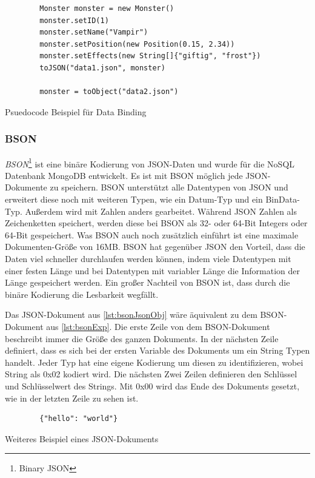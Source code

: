 \begin{listing}[htp]
    \begin{verbatim} 
        Monster monster = new Monster()
        monster.setID(1)
        monster.setName("Vampir")
        monster.setPosition(new Position(0.15, 2.34))
        monster.setEffects(new String[]{"giftig", "frost"})
        toJSON("data1.json", monster)

        monster = toObject("data2.json")
    \end{verbatim}
    \caption{Psuedocode Beispiel für Data Binding}
    \label{lst:dataBindingBsp}
\end{listing}

\subsubsection{BSON}
\textit{BSON}\footnote{Binary JSON} ist eine binäre Kodierung von JSON-Daten und wurde für die NoSQL Datenbank MongoDB entwickelt. Es ist mit BSON möglich jede JSON-Dokumente zu speichern. BSON unterstützt alle Datentypen von JSON und erweitert diese noch mit weiteren Typen, wie ein Datum-Typ und ein BinData-Typ. Außerdem wird mit Zahlen anders gearbeitet. Während JSON Zahlen als Zeichenketten speichert, werden diese bei BSON als 32- oder 64-Bit Integers oder 64-Bit  gespeichert. Was BSON auch noch zusätzlich einführt ist eine maximale Dokumenten-Größe von 16MB. BSON hat gegenüber JSON den Vorteil, dass die Daten viel schneller durchlaufen werden können, indem viele Datentypen mit einer festen Länge und bei Datentypen mit variabler Länge die Information der Länge gespeichert werden. Ein großer Nachteil von BSON ist, dass durch die binäre Kodierung die Lesbarkeit wegfällt.\cite{bsonspecBSONBinary}\cite{postgreSQLandBSON}\cite{mongodbJSONBSON}

Das JSON-Dokument aus \ref{lst:bsonJsonObj} wäre äquivalent zu dem BSON-Dokument aus \ref{lst:bsonExp}. Die erste Zeile von dem BSON-Dokument beschreibt immer die Größe des ganzen Dokuments. In der nächsten Zeile definiert, dass es sich bei der ersten Variable des Dokuments um ein String Typen handelt. Jeder Typ hat eine eigene Kodierung um diesen zu identifizieren, wobei String als 0x02 kodiert wird. Die nächsten Zwei Zeilen definieren den Schlüssel und Schlüsselwert des Strings. Mit 0x00 wird das Ende des Dokuments gesetzt, wie in der letzten Zeile zu sehen ist.

\begin{listing}[htp]
    \begin{verbatim}
        {"hello": "world"}
    \end{verbatim}
    \caption{Weiteres Beispiel eines JSON-Dokuments \cite{mongodbJSONBSON}}
    \label{lst:bsonJsonObj}
\end{listing} 

